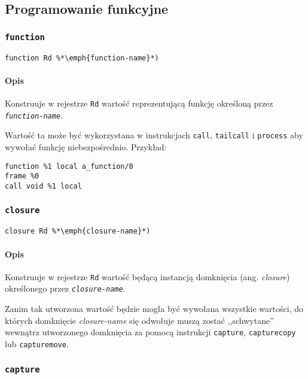 \subsection{Programowanie funkcyjne}
\label{viua_vm_ops_functional}

\subsubsection{\texttt{function}}

\begin{lstlisting}
function Rd %*\emph{function-name}*)
\end{lstlisting}

\paragraph*{Opis} Konstruuje w rejestrze \texttt{Rd} wartość reprezentującą
funkcję określoną przez \texttt{\emph{function-name}}.

Wartość ta może być wykorzystana w instrukcjach \texttt{call}, \texttt{tailcall}
i \texttt{process} aby wywołać funkcję niebezpośrednio. Przykład:
\begin{lstlisting}
function %1 local a_function/0
frame %0
call void %1 local
\end{lstlisting}

\subsubsection{\texttt{closure}}

\begin{lstlisting}
closure Rd %*\emph{closure-name}*)
\end{lstlisting}

\paragraph*{Opis} Konstruuje w rejestrze \texttt{Rd} wartość będącą instancją
domknięcia (ang. \emph{closure}) określonego przez \texttt{\emph{closure-name}}.

Zanim tak utworzona wartość będzie mogła być wywołana wszystkie wartości, do
których domknięcie \emph{closure-name} się odwołuje muszą zostać ,,schwytane''
wewnątrz utworzonego domknięcia za pomocą instrukcji \texttt{capture},
\texttt{capturecopy} lub \texttt{capturemove}.

\subsubsection{\texttt{capture}}

